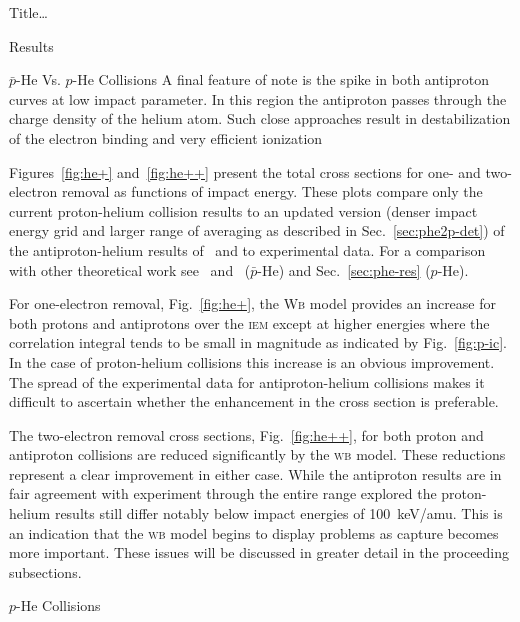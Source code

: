 \documentclass[letterpaper, 10 pt]{report}
\begin{document}
\begin{chapter}{ Title\dots \label{chap:p-he2p-he}}
\begin{section}{Results \label{sec:phe2p-res}}
\begin{subsection}{ \texorpdfstring{$\bar{p}$}{pbar}-He Vs. \texorpdfstring{$p$}{p}-He Collisions
                         \label{sec:pbarhe-res}}
         A final feature of note is the spike in both antiproton curves at low impact parameter. In this
         region the antiproton passes through the charge density of the helium atom. Such close
         approaches result in destabilization of the electron binding and very efficient
         ionization~\cite{pbarhe-rev}

         Figures~\ref{fig:he+} and~\ref{fig:he++} present the total cross sections for one- and
         two-electron removal as functions of impact energy. These plots compare only the current
         proton-helium collision results to an updated version (denser impact energy grid and larger
         range of averaging as described in Sec.~\ref{sec:phe2p-det}) of the antiproton-helium results
         of~\cite{pbarhe} and to experimental data. For a comparison with other theoretical work
         see~\cite{pbarhe} and~\cite{new-pbarhe} ($\bar{p}$-He) and Sec.~\ref{sec:phe-res} ($p$-He).
 
         For one-electron removal, Fig.~\ref{fig:he+}, the \textsc{Wb} model provides an increase for
         both protons and antiprotons over the \textsc{iem} except at higher energies where the
         correlation integral tends to be small in magnitude as indicated by Fig.~\ref{fig:p-ic}. In the
         case of proton-helium collisions this increase is an obvious improvement. The spread of the
         experimental data for antiproton-helium collisions makes it difficult to ascertain whether the
         enhancement in the cross section is preferable.
 
         The two-electron removal cross sections, Fig.~\ref{fig:he++}, for both proton and antiproton
         collisions are reduced significantly by the \textsc{wb} model. These reductions represent a
         clear improvement in either case. While the antiproton results are in fair agreement with
         experiment through the entire range explored the proton-helium results still differ notably
         below impact energies of 100~keV/amu. This is an indication that the \textsc{wb} model begins
         to display problems as capture becomes more important. These issues will be discussed in
         greater detail in the proceeding subsections.

      \end{subsection}

      \begin{subsection}{\texorpdfstring{$p$}{p}-He Collisions \label{sec:phe-res}}

         \begin{figure}[ht]
            \begin{minipage}{.49\linewidth}
 

\end{minipage}
\end{figure}
\end{subsection}
\end{section}
\end{chapter}
\end{document}
